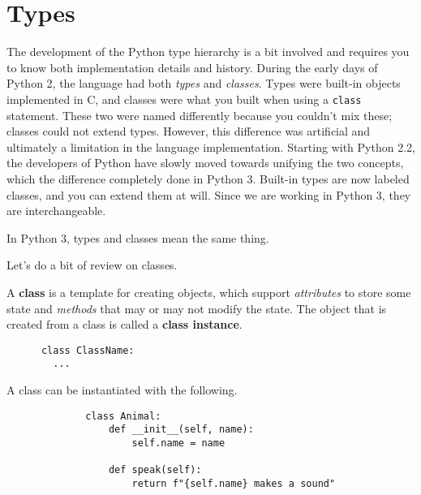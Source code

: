 \section{Types} 

  The development of the Python type hierarchy is a bit involved and requires you to know both implementation details and history. During the early days of Python 2, the language had both \textit{types} and \textit{classes}. Types were built-in objects implemented in C, and classes were what you built when using a \texttt{class} statement. These two were named differently because you couldn't mix these; classes could not extend types. However, this difference was artificial and ultimately a limitation in the language implementation. Starting with Python 2.2, the developers of Python have slowly moved towards unifying the two concepts, which the difference completely done in Python 3. Built-in types are now labeled classes, and you can extend them at will. Since we are working in Python 3, they are interchangeable.  

  \begin{theorem}
    In Python 3, types and classes mean the same thing. 
  \end{theorem} 

  Let's do a bit of review on classes. 

  \begin{definition}[Class] 
    A \textbf{class} is a template for creating objects, which support \textit{attributes} to store some state and \textit{methods} that may or may not modify the state. The object that is created from a class is called a \textbf{class instance}. 

    \begin{lstlisting}
      class ClassName: 
        ...  
    \end{lstlisting}
  \end{definition}

  \begin{example}
    A class can be instantiated with the following. 

    \begin{figure}[H]
      \centering 
      \begin{lstlisting}
        class Animal: 
            def __init__(self, name):
                self.name = name
            
            def speak(self):
                return f"{self.name} makes a sound"
      \end{lstlisting} 
      \caption{} 
      \label{fig:animal_class}
    \end{figure}
  \end{example}  

